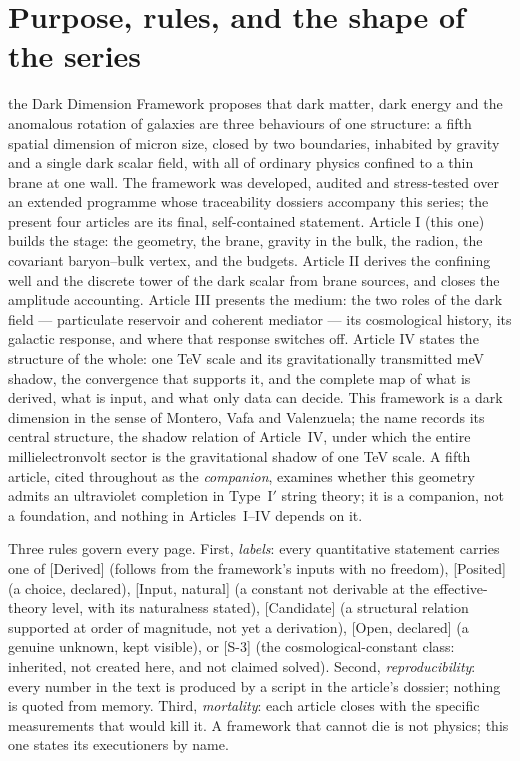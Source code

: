 \section{Purpose, rules, and the shape of the series}
the Dark Dimension Framework proposes that dark matter, dark energy and the anomalous rotation of galaxies are three behaviours of one structure: a fifth spatial dimension of micron size, closed by two boundaries, inhabited by gravity and a single dark scalar field, with all of ordinary physics confined to a thin brane at one wall. The framework was developed, audited and stress-tested over an extended programme whose traceability dossiers accompany this series; the present four articles are its final, self-contained statement. Article I (this one) builds the stage: the geometry, the brane, gravity in the bulk, the radion, the covariant baryon--bulk vertex, and the budgets. Article II derives the confining well and the discrete tower of the dark scalar from brane sources, and closes the amplitude accounting. Article III presents the medium: the two roles of the dark field --- particulate reservoir and coherent mediator --- its cosmological history, its galactic response, and where that response switches off. Article IV states the structure of the whole: one TeV scale and its gravitationally transmitted meV shadow, the convergence that supports it, and the complete map of what is derived, what is input, and what only data can decide. This framework is a dark dimension in the sense of Montero, Vafa and Valenzuela; the name records its central structure, the shadow relation of Article~IV, under which the entire millielectronvolt sector is the gravitational shadow of one TeV scale. A fifth article, cited throughout as the \emph{companion}, examines whether this geometry admits an ultraviolet completion in Type~I$'$ string theory; it is a companion, not a foundation, and nothing in Articles~I--IV depends on it.

Three rules govern every page. First, \emph{labels}: every quantitative statement carries one of [Derived] (follows from the framework's inputs with no freedom), [Posited] (a choice, declared), [Input, natural] (a constant not derivable at the effective-theory level, with its naturalness stated), [Candidate] (a structural relation supported at order of magnitude, not yet a derivation), [Open, declared] (a genuine unknown, kept visible), or [S-3] (the cosmological-constant class: inherited, not created here, and not claimed solved). Second, \emph{reproducibility}: every number in the text is produced by a script in the article's dossier; nothing is quoted from memory. Third, \emph{mortality}: each article closes with the specific measurements that would kill it. A framework that cannot die is not physics; this one states its executioners by name.

